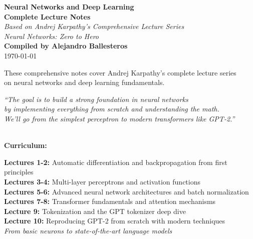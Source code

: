 \documentclass[11pt]{article}
\theoremstyle{definition}
\begin{document}
\thispagestyle{empty}
\begin{center}
\vspace*{1cm}

\Huge\textbf{\color{blue!80!black}Neural Networks and Deep Learning}\\[0.4cm]
\LARGE\textbf{\color{blue!60!black}Complete Lecture Notes}\\[0.8cm]
\large\textit{Based on Andrej Karpathy's Comprehensive Lecture Series}\\[0.3cm]
\normalsize\textit{Neural Networks: Zero to Hero}\\[1.5cm]

\Large\textbf{Compiled by Alejandro Ballesteros}\\[0.3cm]

\Large\today
\end{center}

\vfill
\begin{center}
\large
\normalsize
These comprehensive notes cover Andrej Karpathy's complete lecture series\\
on neural networks and deep learning fundamentals.\\[0.6cm]

\begin{minipage}{0.8\textwidth}
\centering
\textit{\color{blue!60!black}``The goal is to build a strong foundation in neural networks\\
by implementing everything from scratch and understanding the math.\\
We'll go from the simplest perceptron to modern transformers like GPT-2.''}\\[0.4cm]
\end{minipage}\\[0.8cm]

\textbf{\color{blue!70!black}Curriculum:}\\[0.3cm]
\begin{minipage}{0.95\textwidth}
\small
\textbf{Lectures 1-2:} Automatic differentiation and backpropagation from first principles\\
\textbf{Lectures 3-4:} Multi-layer perceptrons and activation functions\\
\textbf{Lectures 5-6:} Advanced neural network architectures and batch normalization\\
\textbf{Lectures 7-8:} Transformer fundamentals and attention mechanisms\\
\textbf{Lecture 9:} Tokenization and the GPT tokenizer deep dive\\
\textbf{Lecture 10:} Reproducing GPT-2 from scratch with modern techniques\\[0.3cm]
\textit{From basic neurons to state-of-the-art language models}
\end{minipage}
\end{center}
\vfill
\end{document}
